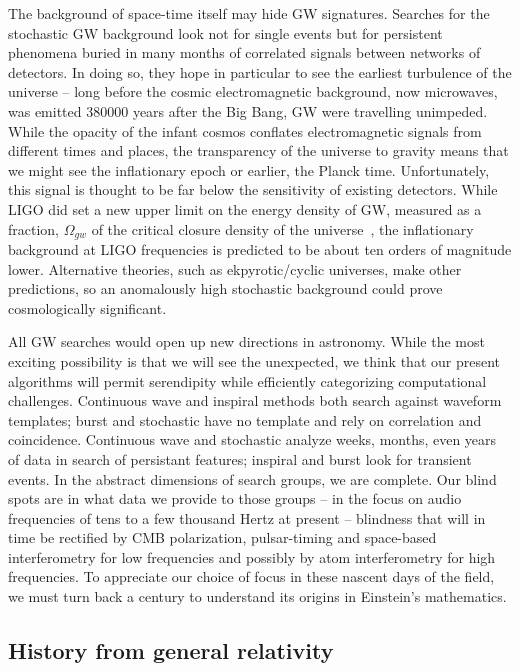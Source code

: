 The background of space-time itself may hide GW signatures. 
Searches for the stochastic GW background look not for single events but for persistent phenomena buried in many months of correlated signals between networks of detectors. 
In doing so, they hope in particular to see the earliest turbulence of the universe -- long before the cosmic electromagnetic background, now microwaves, was emitted 380000 years after the Big Bang, GW were travelling unimpeded. 
While the opacity of the infant cosmos conflates electromagnetic signals from different times and places, the transparency of the universe to gravity means that we might see the inflationary epoch or earlier, the Planck time. 
Unfortunately, this signal is thought to be far below the sensitivity of existing detectors. 
While LIGO did set a new upper limit on the energy density of GW, measured as a fraction, $\Omega_{gw}$ of the critical closure density of the universe~\cite{LIGOStochasticNature2009}, the inflationary background at LIGO frequencies is predicted to be about ten orders of magnitude lower. 
Alternative theories, such as ekpyrotic/cyclic universes, make other predictions, so an anomalously high stochastic background could prove cosmologically significant.

All GW searches would open up new directions in astronomy. 
While the most exciting possibility is that we will see the unexpected, we think that our present algorithms will permit serendipity while efficiently categorizing computational challenges. 
Continuous wave and inspiral methods both search against waveform templates; burst and stochastic have no template and rely on correlation and coincidence. 
Continuous wave and stochastic analyze weeks, months, even years of data in search of persistant features; inspiral and burst look for transient events. 
In the abstract dimensions of search groups, we are complete. 
Our blind spots are in what data we provide to those groups -- in the focus on audio frequencies of tens to a few thousand Hertz at present -- blindness that will in time be rectified by CMB polarization, pulsar-timing and space-based interferometry for low frequencies and possibly by atom interferometry for high frequencies. 
To appreciate our choice of focus in these nascent days of the field, we must turn back a century to understand its origins in Einstein's mathematics.

        \subsection{History from general relativity}
        \label{history_GR}

